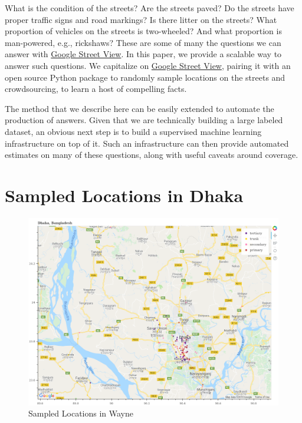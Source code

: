 \documentclass[12pt, letterpaper]{article}
\begin{document}
What is the condition of the streets? Are the streets paved? Do the streets have proper traffic signs and road markings? Is there litter on the streets? What proportion of vehicles on the streets is two-wheeled? And what proportion is man-powered, e.g., rickshaws? These are some of many the questions we can answer with \href{https://www.google.com/streetview/}{Google Street View}. In this paper, we provide a scalable way to answer such questions. We capitalize on \href{https://www.google.com/streetview/}{Google Street View}, pairing it with an open source Python package to randomly sample locations on the streets and crowdsourcing, to learn a host of compelling facts. 

The method that we describe here can be easily extended to automate the production of answers. Given that we are technically building a large labeled dataset, an obvious next step is to build a supervised machine learning infrastructure on top of it. Such an infrastructure can then provide automated estimates on many of these questions, along with useful caveats around coverage.

\clearpage


\clearpage
\appendix


\renewcommand{\thesection}{SI \arabic{section}}
\renewcommand\thetable{\thesection.\arabic{table}}  
\renewcommand\thefigure{\thesection.\arabic{figure}}

\section{Sampled Locations in Dhaka}
\begin{figure}[H]
\centering
\caption{Sampled Locations in Wayne} \label{fig:google_dhaka}
	\includegraphics[width=\textwidth]{../figs/dhaka-gmap.png}
\end{figure}
\clearpage
\end{document}
